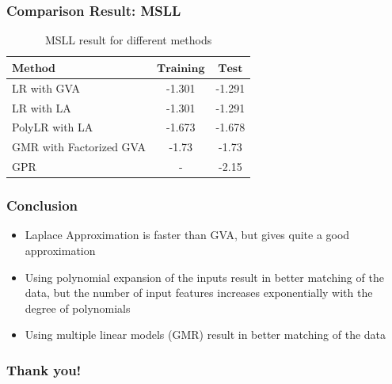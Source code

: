 \documentclass[xcolor=table]{beamer}
\begin{document}
\begin{frame}
\frametitle{Comparison Result: MSLL}
\centering
\renewcommand{\arraystretch}{1.3}
\begin{table}[t]
\centering
\caption{MSLL result for different methods}
\begin{tabular}{l c c}
\hline
$\textbf{Method}$ & $\textbf{Training}$ & $\textbf{Test}$ \\ \hline 
LR with GVA     	& -1.301	& -1.291	  \\
LR with LA      & -1.301	& -1.291	  \\
PolyLR with LA    	& -1.673	&-1.678	  \\
GMR with Factorized GVA & -1.73	& -1.73 \\
GPR &   -	& -2.15 \\
\hline
\end{tabular}
\label{tab:cartesian}
\end{table}

\end{frame}

\begin{frame}
\frametitle{Conclusion}
\begin{itemize}
\item Laplace Approximation is faster than GVA, but gives quite a good approximation
\item Using polynomial expansion of the inputs result in better matching of the data, but the number of input features increases exponentially with the degree of polynomials
\item Using multiple linear models (GMR) result in better matching of the data
\end{itemize}
\centering
\end{frame}


\begin{frame}
\frametitle{Thank you!}
\centering
\end{frame}
\end{document}
